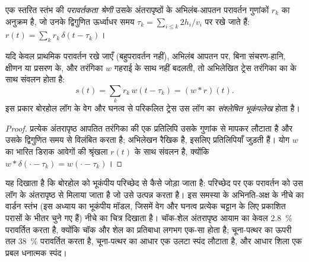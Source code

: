 \begin{definition}[परावर्तकता श्रेणी]\label{def:b3:exploration-seismology:synthetic}
एक स्तरित स्तंभ की \emph{परावर्तकता श्रेणी} उसके अंतरापृष्ठों के
अभिलंब-आपतन परावर्तन गुणांकों $r_k$ का अनुक्रम है, जो उनके द्विगुणित ऊर्ध्वाधर
समय $\tau_k = \sum_{i \le k} 2h_i/v_i$ पर रखे जाते हैं:
$r(t) = \sum_k r_k\,\delta(t - \tau_k)$।
\end{definition}

\begin{proposition}[संवलन मॉडल]\label{prop:b3:exploration-seismology:synthetic}
यदि केवल प्राथमिक परावर्तन रखे जाएँ (बहुपरावर्तन नहीं), अभिलंब आपतन पर, बिना संचरण-हानि,
क्षीणन या प्रसरण के, और तरंगिका $w$ गहराई के साथ नहीं बदलती, तो अभिलेखित
ट्रेस तरंगिका का
 के साथ संवलन होता है:
\[
  s(t) = \sum_k r_k\,w(t - \tau_k) = (w*r)(t) .
\]
इस प्रकार बोरहोल लॉग के वेग और घनत्व से परिकलित ट्रेस
उस लॉग का \emph{संश्लेषित भूकंपलेख} होता है।
\end{proposition}

\begin{proof}
प्रत्येक अंतरापृष्ठ आपतित तरंगिका की एक प्रतिलिपि उसके गुणांक से मापकर लौटाता है और उसके द्विगुणित समय से विलंबित करता है;
अभिलेखन रैखिक है, इसलिए प्रतिलिपियाँ जुड़ती हैं।
योग $w$ का भारित डिराक आवेगों की श्रृंखला
$r(t)$ के साथ संवलन है, क्योंकि $w*\delta(\cdot - \tau_k) = w(\cdot - \tau_k)$।
\end{proof}

 यह दिखाता है कि बोरहोल को भूकंपीय परिच्छेद से कैसे जोड़ा जाता है:
परिच्छेद पर एक परावर्तन को उस लॉग के अंतरापृष्ठ से मिलाया जाता है जो उसे उत्पन्न करता है।
इस समस्या के अभिनति-अक्ष के नीचे का वार्डन स्तंभ (इस अध्याय का भूकंपीय मॉडल,
जिसमें वेग और घनत्व प्रत्येक चट्टान के लिए
प्रकाशित परासों के भीतर चुने गए हैं)
नीचे का चित्र दिखाता है। चॉक-शेल अंतरापृष्ठ आयाम का केवल
\qty{2.8}{\percent} परावर्तित करता है, क्योंकि चॉक और शेल का प्रतिबाधा लगभग
एक-सा होता है; चूना-पत्थर का ऊपरी तल \qty{38}{\percent} परावर्तित करता है,
चूना-पत्थर का आधार एक उलटा स्पंद लौटाता है, और आधार शिला एक
प्रबल धनात्मक स्पंद।


